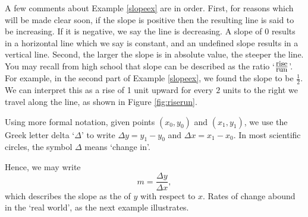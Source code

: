 \medskip

A few comments about Example \ref{slopeex} are in order.  First, for reasons which will be made clear soon, if the slope is positive then the resulting line is said to be increasing.  If it is negative, we say the line is decreasing.  A slope of $0$ results in a horizontal line which we say is constant, and an undefined slope results in a vertical line. Second, the larger the slope is in absolute value, the steeper the line.  You may recall from high school that slope can be described as the ratio `$\frac{\mbox{\small rise}}{\mbox{\small run}}$'.  For example, in the second part of Example \ref{slopeex}, we found the slope to be $\frac{1}{2}$.  We can interpret this as a rise of 1 unit upward for every $2$ units to the right we travel along the line, as shown in Figure \ref{fig:riserun}.



Using more formal notation, given points $\left(x_{0}, y_{0}\right)$ and $\left(x_{1}, y_{1}\right)$, we use the Greek letter delta `$\Delta$' to write $\Delta y = y_{1} - y_{0}$ and $\Delta x = x_{1} - x_{0}$.  In most scientific circles, the symbol $\Delta$ means `change in'.  

\smallskip

Hence, we may write \[ m = \dfrac{\Delta y}{\Delta x},\] which describes the slope as the  of $y$ with respect to $x$.  Rates of change abound in the `real world', as the next example illustrates.

\medskip

